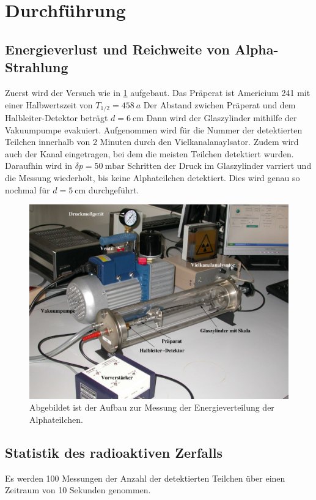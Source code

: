 

\section{Durchführung}
\label{sec:Durchführung}
\subsection{Energieverlust und Reichweite von Alpha-Strahlung}
Zuerst wird der Versuch wie in \ref{fig:Aufbau} aufgebaut.
Das Präperat ist Americium 241 mit einer Halbwertszeit von $T_{1/2}=\qty{458}{a}$
Der Abstand zwichen Präperat und dem Halbleiter-Detektor beträgt $d=\qty{6}{\centi\meter}$
Dann wird der Glaszylinder mithilfe der Vakuumpumpe evakuiert.
Aufgenommen wird für die Nummer der detektierten Teilchen innerhalb von 2 Minuten durch den Vielkanalanaylsator.
Zudem wird auch der Kanal eingetragen, bei dem die meisten Teilchen detektiert wurden.
Daraufhin wird in $\delta p=\qty{50}{\milli\bar}$ Schritten der Druck im Glaszylinder varriert und die Messung wiederholt, bis keine Alphateilchen detektiert.
Dies wird genau so nochmal für $d=\qty{5}{\centi\meter}$ durchgeführt.

\begin{figure}
    \centering
    \includegraphics[width=\textwidth]{Bilder/Aufbau.png}
    \caption{Abgebildet ist der Aufbau zur Messung der Energieverteilung der Alphateilchen.}
    \label{fig:Aufbau}
\end{figure}

\subsection{Statistik des radioaktiven Zerfalls}
Es werden 100 Messungen der Anzahl der detektierten Teilchen über einen Zeitraum von 10 Sekunden genommen.